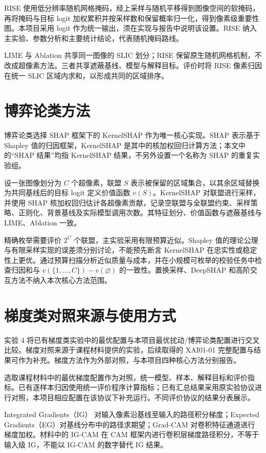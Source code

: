 RISE\cite{petsiuk2018rise} 使用低分辨率随机网格掩码，经上采样与随机平移得到图像空间的软掩码，再将掩码与目标 logit 加权累积并按采样数和保留概率归一化，得到像素级重要性图。本项目采用 logit 作为统一输出，须在实现与报告中说明该设置。RISE 纳入主实验、参数分析和主要统计结论，代表随机掩码路线。

LIME 与 Ablation 共享同一图像的 SLIC 划分；RISE 保留原生随机网格机制，不改成超像素方法。三者共享遮蔽基线、模型与解释目标。评价时将 RISE 像素归因在统一 SLIC 区域内求和，以形成共同的区域排序。

\section{博弈论类方法}

博弈论类选择 SHAP 框架下的 KernelSHAP\cite{lundberg2017shap} 作为唯一核心实现。SHAP 表示基于 Shapley 值的归因框架，KernelSHAP 是其中的核加权回归计算方法；本文中的“SHAP 结果”均指 KernelSHAP 结果，不另外设置一个名称为 SHAP 的重复实验组。

设一张图像划分为 $C$ 个超像素，联盟 $S$ 表示被保留的区域集合，以其余区域替换为共同基线后的目标 logit 定义价值函数 $v(S)$。KernelSHAP 对联盟进行采样，并使用 SHAP 核加权回归估计各超像素贡献，记录空联盟与全联盟约束、采样策略、正则化、背景基线及实际模型调用次数。其特征划分、价值函数与遮蔽基线与 LIME、Ablation 一致。

精确枚举需要评价 $2^C$ 个联盟，主实验采用有限预算近似。Shapley 值的理论公理与有限采样实现的误差须分别讨论，不能预先断言 KernelSHAP 在忠实性或稳定性上更优。通过预算扫描分析近似质量与成本，并在小规模可枚举的校验任务中检查归因和与 $v(\{1,\ldots,C\})-v(\varnothing)$ 的一致性。置换采样、DeepSHAP 和高阶交互方法不纳入本次核心方法范围。

\section{梯度类对照来源与使用方式}

实验 4 将已有梯度类实验中的最优配置与本项目最优扰动/博弈论类配置进行交叉比较。梯度对照来源于课程材料提供的实验，后续取得的 XAI01-01 完整配置与结果可作为补充。梯度方法作为外部对照，与本项目四种核心方法分别报告。

选取课程材料中的最优梯度配置作为对照，统一模型、样本、解释目标和评价指标。已有逐样本归因使用统一评价程序计算指标；已有汇总结果采用原实验协议进行对照，本项目相应配置在该协议下补充运行。不同评价协议的结果分表展示。

Integrated Gradients（IG）\cite{sundararajan2017ig} 对输入像素沿基线至输入的路径积分梯度；Expected Gradients（EG）对基线分布中的路径求期望；Grad-CAM\cite{selvaraju2017gradcam} 对卷积特征通道进行梯度加权。材料中的 IG-CAM\cite{qin2026sgn} 在 CAM 框架内进行卷积层梯度路径积分，不等于输入级 IG，不能以 IG-CAM 的数字替代 IG 结果。

